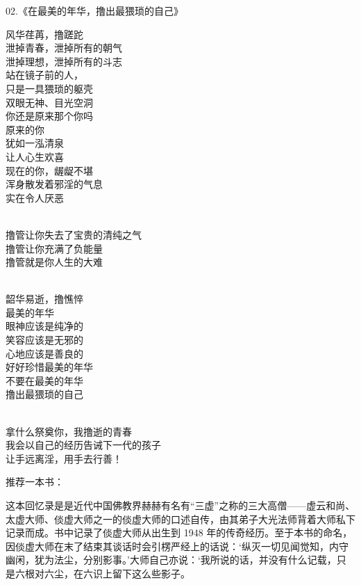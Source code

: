 \begin{center}
    02.《在最美的年华，撸出最猥琐的自己》\it
    \begin{multicols}{2}
        风华荏苒，撸蹉跎 \\ 泄掉青春，泄掉所有的朝气 \\ 泄掉理想，泄掉所有的斗志 \\ 站在镜子前的人， \\ 只是一具猥琐的躯壳 \\ 双眼无神、目光空洞 \\ 你还是原来那个你吗 \\ 原来的你 \\ 犹如一泓清泉 \\ 让人心生欢喜 \\ 现在的你，龌龊不堪 \\ 浑身散发着邪淫的气息 \\ 实在令人厌恶

        ~\\

        撸管让你失去了宝贵的清纯之气 \\ 撸管让你充满了负能量 \\ 撸管就是你人生的大难

        ~\\

        韶华易逝，撸憔悴 \\ 最美的年华 \\ 眼神应该是纯净的 \\ 笑容应该是无邪的 \\ 心地应该是善良的 \\ 好好珍惜最美的年华 \\ 不要在最美的年华 \\ 撸出最猥琐的自己

        ~\\

        拿什么祭奠你，我撸逝的青春 \\ 我会以自己的经历告诫下一代的孩子 \\ 让手远离淫，用手去行善！
    \end{multicols}
\end{center}

推荐一本书：

\begin{book}[《影尘回忆录》]
    这本回忆录是是近代中国佛教界赫赫有名有“三虚”之称的三大高僧——虚云和尚、太虚大师、倓虚大师之一的倓虚大师的口述自传，由其弟子大光法师背着大师私下记录而成。书中记录了倓虚大师从出生到 1948 年的传奇经历。至于本书的命名，因倓虚大师在末了结束其谈话时会引楞严经上的话说：‘纵灭一切见闻觉知，内守幽闲，犹为法尘，分别影事。’大师自己亦说：‘我所说的话，并没有什么记载，只是六根对六尘，在六识上留下这么些影子。
\end{book}

